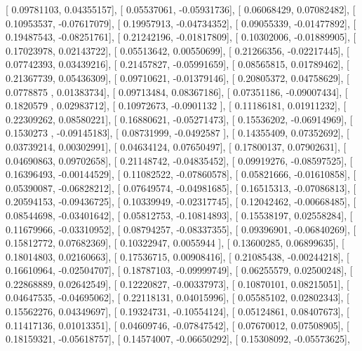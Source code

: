 \documentclass{article}
\begin{document}
       [ 0.09781103,  0.04355157],
       [ 0.05537061, -0.05931736],
       [ 0.06068429,  0.07082482],
       [ 0.10953537, -0.07617079],
       [ 0.19957913, -0.04734352],
       [ 0.09055339, -0.01477892],
       [ 0.19487543, -0.08251761],
       [ 0.21242196, -0.01817809],
       [ 0.10302006, -0.01889905],
       [ 0.17023978,  0.02143722],
       [ 0.05513642,  0.00550699],
       [ 0.21266356, -0.02217445],
       [ 0.07742393,  0.03439216],
       [ 0.21457827, -0.05991659],
       [ 0.08565815,  0.01789462],
       [ 0.21367739,  0.05436309],
       [ 0.09710621, -0.01379146],
       [ 0.20805372,  0.04758629],
       [ 0.0778875 ,  0.01383734],
       [ 0.09713484,  0.08367186],
       [ 0.07351186, -0.09007434],
       [ 0.1820579 ,  0.02983712],
       [ 0.10972673, -0.0901132 ],
       [ 0.11186181,  0.01911232],
       [ 0.22309262,  0.08580221],
       [ 0.16880621, -0.05271473],
       [ 0.15536202, -0.06914969],
       [ 0.1530273 , -0.09145183],
       [ 0.08731999, -0.0492587 ],
       [ 0.14355409,  0.07352692],
       [ 0.03739214,  0.00302991],
       [ 0.04634124,  0.07650497],
       [ 0.17800137,  0.07902631],
       [ 0.04690863,  0.09702658],
       [ 0.21148742, -0.04835452],
       [ 0.09919276, -0.08597525],
       [ 0.16396493, -0.00144529],
       [ 0.11082522, -0.07860578],
       [ 0.05821666, -0.01610858],
       [ 0.05390087, -0.06828212],
       [ 0.07649574, -0.04981685],
       [ 0.16515313, -0.07086813],
       [ 0.20594153, -0.09436725],
       [ 0.10339949, -0.02317745],
       [ 0.12042462, -0.00668485],
       [ 0.08544698, -0.03401642],
       [ 0.05812753, -0.10814893],
       [ 0.15538197,  0.02558284],
       [ 0.11679966, -0.03310952],
       [ 0.08794257, -0.08337355],
       [ 0.09396901, -0.06840269],
       [ 0.15812772,  0.07682369],
       [ 0.10322947,  0.0055944 ],
       [ 0.13600285,  0.06899635],
       [ 0.18014803,  0.02160663],
       [ 0.17536715,  0.00908416],
       [ 0.21085438, -0.00244218],
       [ 0.16610964, -0.02504707],
       [ 0.18787103, -0.09999749],
       [ 0.06255579,  0.02500248],
       [ 0.22868889,  0.02642549],
       [ 0.12220827, -0.00337973],
       [ 0.10870101,  0.08215051],
       [ 0.04647535, -0.04695062],
       [ 0.22118131,  0.04015996],
       [ 0.05585102,  0.02802343],
       [ 0.15562276,  0.04349697],
       [ 0.19324731, -0.10554124],
       [ 0.05124861,  0.08407673],
       [ 0.11417136,  0.01013351],
       [ 0.04609746, -0.07847542],
       [ 0.07670012,  0.07508905],
       [ 0.18159321, -0.05618757],
       [ 0.14574007, -0.06650292],
       [ 0.15308092, -0.05573625],
\end{document}
